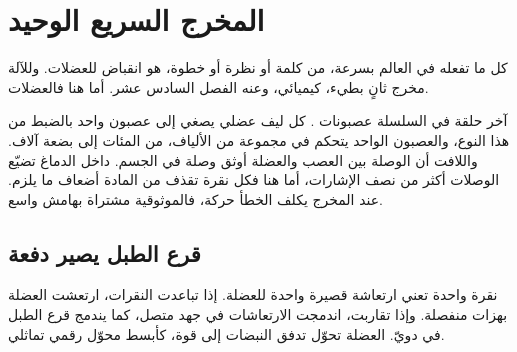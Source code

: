\chapter{المخرج السريع الوحيد}

كل ما تفعله في العالم بسرعة، من كلمة أو نظرة أو خطوة، هو انقباض للعضلات. وللآلة مخرج ثانٍ بطيء، كيميائي، وعنه الفصل السادس عشر. أما هنا فالعضلات.

آخر حلقة في السلسلة عصبونات . كل ليف عضلي يصغي إلى عصبون واحد بالضبط من هذا النوع، والعصبون الواحد يتحكم في مجموعة من الألياف، من المئات إلى بضعة آلاف. واللافت أن الوصلة بين العصب والعضلة أوثق وصلة في الجسم. داخل الدماغ تضيّع الوصلات أكثر من نصف الإشارات، أما هنا فكل نقرة تقذف من المادة أضعاف ما يلزم. عند المخرج يكلف الخطأ حركة، فالموثوقية مشتراة بهامش واسع.

\section*{قرع الطبل يصير دفعة}

نقرة واحدة تعني ارتعاشة قصيرة واحدة للعضلة. إذا تباعدت النقرات، ارتعشت العضلة بهزات منفصلة. وإذا تقاربت، اندمجت الارتعاشات في جهد متصل، كما يندمج قرع الطبل في دويّ. العضلة تحوّل تدفق النبضات إلى قوة، كأبسط محوّل رقمي تماثلي.

